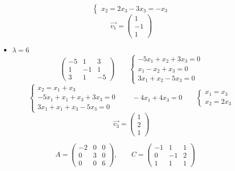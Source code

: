 \begin{itemize}
$$\begin{cases}
        x_2 = 2x_3 - 3x_3 = -x_3
    \end{cases} $$
    $$ \vec{v_1} =
    \begin{pmatrix}
    	1 \\
        -1 \\
        1
    \end{pmatrix} $$
    \item $ \lambda = 6 $
    $$
    \begin{pmatrix}
    	-5 & 1 & 3 \\
        1 & -1 & 1 \\
        3 & 1 & -5
    \end{pmatrix} \qquad
    \begin{cases}
    	-5x_1 + x_2 + 3x_3 = 0 \\
        x_1 - x_2 + x_3 = 0 \\
        3x_1 + x_2 - 5x_3 = 0
    \end{cases} $$
    $$
    \begin{cases}
    	x_2 = x_1 + x_3 \\
        -5x_1 + x_1 + x_3 + 3x_3 = 0 \\
        3x_1 + x_1 + x_3 - 5x_3 = 0
    \end{cases} \qquad -4x_1 + 4x_3 = 0 \qquad
    \begin{cases}
    	x_1 = x_3 \\
        x_2 = 2x_3
    \end{cases} $$
    $$ \vec{v_3} =
    \begin{pmatrix}
    	1 \\
        2 \\
        1
    \end{pmatrix} $$
\end{itemize}
$$ A =
\begin{pmatrix}
	-2 & 0 & 0 \\
    0 & 3 & 0 \\
    0 & 0 & 6
\end{pmatrix}, \qquad C =
\begin{pmatrix}
	-1 & 1 & 1 \\
    0 & -1 & 2 \\
    1 & 1 & 1
\end{pmatrix} $$

\section{}

